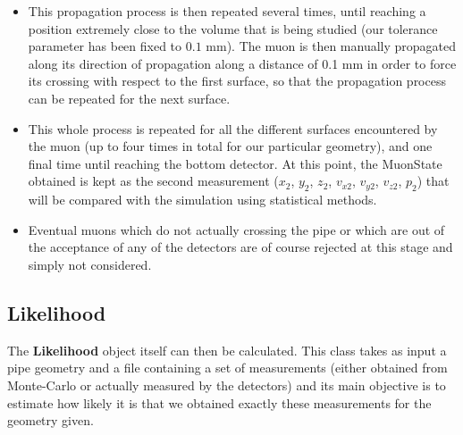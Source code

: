 \documentclass[a4paper, 11pt]{report}
\begin{document}
\begin{itemize}
\item This propagation process is then repeated several times, until reaching a position extremely close to the volume that is being studied (our tolerance parameter has been fixed to $0.1$ mm). The muon is then manually propagated along its direction of propagation along a distance of 0.1 mm in order to force its crossing with respect to the first surface, so that the propagation process can be repeated for the next surface.
\item This whole process is repeated for all the different surfaces encountered by the muon (up to four times in total for our particular geometry), and one final time until reaching the bottom detector. At this point, the MuonState obtained is kept as the second measurement ($x_2$, $y_2$, $z_2$, $v_{x2}$, $v_{y2}$, $v_{z2}$, $p_2$) that will be compared with the simulation using statistical methods.
\item Eventual muons which do not actually crossing the pipe or which are out of the acceptance of any of the detectors are of course rejected at this stage and simply not considered.
\end{itemize}

\subsection{Likelihood}

The \textbf{Likelihood} object itself can then be calculated. This class takes as input a pipe geometry and a file containing a set of measurements (either obtained from Monte-Carlo or actually measured by the detectors) and its main objective is to estimate how likely it is that we obtained exactly these measurements for the geometry given. 
\end{document}
